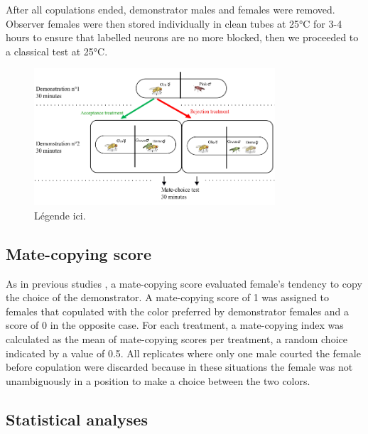 \documentclass[a4paper, 12pt]{article}
\begin{document}
	After all copulations ended, demonstrator males and females were removed. Observer females were then stored individually in clean tubes at 25°C for 3-4 hours to ensure that labelled neurons are no more blocked, then we proceeded to a classical test at 25°C.

	\begin{figure}
	\centering
	\includegraphics[width=0.8\textwidth]{images/ar}
	\caption{Légende ici.}
	\label{fig:ar}
\end{figure}

	\subsection{Mate-copying score}

	As in previous studies \parencite{danchin_cultural_2018,nobel_mate-copying_2018,monier_dopamine_2018}, a mate-copying score evaluated female’s tendency to copy the choice of the demonstrator. A mate-copying score of 1 was assigned to females that copulated with the color preferred by demonstrator females and a score of 0 in the opposite case. For each treatment, a mate-copying index was calculated as the mean of mate-copying scores per treatment, a random choice indicated by a value of 0.5. All replicates where only one male courted the female before copulation were discarded because in these situations the female was not unambiguously in a position to make a choice between the two colors.

	\subsection{Statistical analyses}
\end{document}
